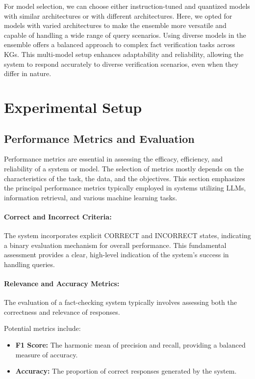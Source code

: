 For model selection, we can choose either instruction-tuned and quantized models with similar architectures or with different architectures.
Here, we opted for models with varied architectures to make the ensemble more versatile and capable of handling a wide range of query scenarios.
Using diverse models in the ensemble offers a balanced approach to complex fact verification tasks across \acp{KG}.
This multi-model setup enhances adaptability and reliability, allowing the system to respond accurately to diverse verification scenarios, even when they differ in nature.

\section{Experimental Setup}\label{sec:empirical-evaluation:experimental-setup}
\subsection{Performance Metrics and Evaluation}\label{subsec:empirical-evaluation:experimental-setup:performance-metrics-and-evaluation}
Performance metrics are essential in assessing the efficacy, efficiency, and reliability of a system or model.
The selection of metrics mostly depends on the characteristics of the task, the data, and the objectives.
This section emphasizes the principal performance metrics typically employed in systems utilizing LLMs, information retrieval, and various machine learning tasks.
\paragraph{Correct and Incorrect Criteria:}
The system incorporates explicit CORRECT and INCORRECT states, indicating a binary evaluation mechanism for overall performance.
This fundamental assessment provides a clear, high-level indication of the system's success in handling queries.
\paragraph{Relevance and Accuracy Metrics:}
The evaluation of a fact-checking system typically involves assessing both the correctness and relevance of responses.

Potential metrics include:
\begin{itemize}
    \item \textbf{F1 Score:} The harmonic mean of precision and recall, providing a balanced measure of accuracy.
    \item \textbf{Accuracy:} The proportion of correct responses generated by the system.
\end{itemize}
